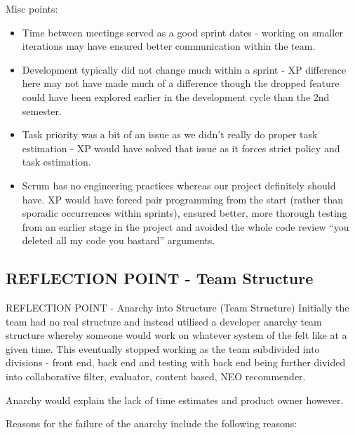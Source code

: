 \documentclass{l3proj}
\begin{document}
Misc points:
\begin{itemize}
\item Time between meetings served as a good sprint dates - working on smaller iterations may have ensured better communication within the team.
\item Development typically did not change much within a sprint - XP difference here may not have made much of a difference though the dropped feature could have been explored earlier in the development cycle than the 2nd semester.
\item Task priority was a bit of an issue as we didn’t really do proper task estimation - XP would have solved that issue as it forces strict policy and task estimation.
\item Scrum has no engineering practices whereas our project definitely should have. XP would have forced pair programming from the start (rather than sporadic occurrences within sprints), ensured better, more thorough testing from an earlier stage in the project and avoided the whole code review “you deleted all my code you bastard” arguments.
\end{itemize}



\subsection{REFLECTION POINT - Team Structure}
\label{teamstructure}

REFLECTION POINT - Anarchy into Structure (Team Structure)
Initially the team had no real structure and instead utilised a developer anarchy team structure whereby someone would work on whatever system of the felt like at a given time. This eventually stopped working as the team subdivided into divisions - front end, back end and testing with back end being further divided into collaborative filter, evaluator, content based, NEO recommender.

Anarchy would explain the lack of time estimates and product owner however.

Reasons for the failure of the anarchy include the following reasons:
\end{document}
